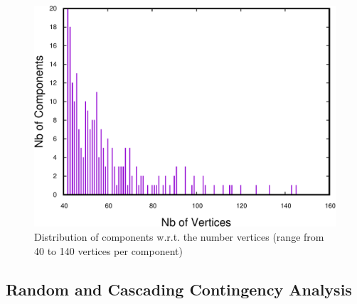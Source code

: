 \begin{figure}
\centering
\includegraphics[scale=0.35]{bench/generated/frequency-selected-crop.pdf}
\caption{Distribution of components w.r.t. the number vertices (range from 40 to 140 vertices per component)}
\label{fig:vertices-components-40}
\end{figure}



\subsection{Random and Cascading Contingency Analysis}

